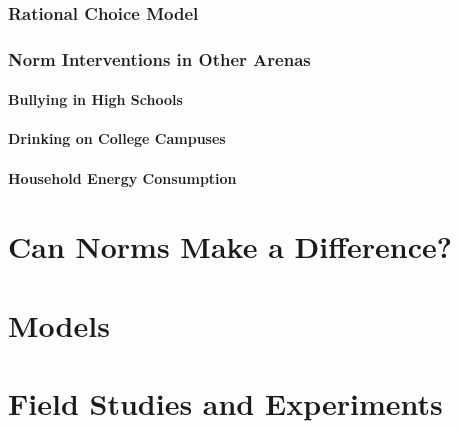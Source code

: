 \documentclass[rutwik_proposal.tex]{subfiles}
\begin{document}
\subsection{Rational Choice Model}\label{subsec:rationality}

\subsection{Norm Interventions in Other Arenas}\label{subsec:interventions}

\subsubsection{Bullying in High Schools}\label{bullying}

\subsubsection{Drinking on College Campuses}\label{drinking}

\subsubsection{Household Energy Consumption}\label{electricity}

\chapter{Can Norms Make a Difference?}\label{ch:usefulness}

\chapter{Models}\label{ch:models}

\chapter{Field Studies and Experiments}\label{ch:field}
\end{document}
